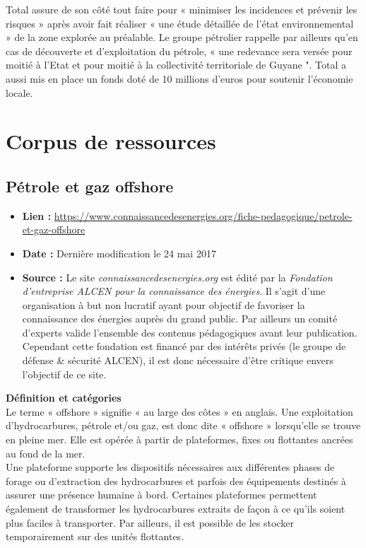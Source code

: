\documentclass[8pt]{article}
\begin{document}
Total assure de son côté tout faire pour « minimiser les incidences et prévenir les risques » après avoir fait réaliser « une étude détaillée de l'état environnemental » de la zone explorée au préalable. Le groupe pétrolier rappelle par ailleurs qu'en cas de découverte et d'exploitation du pétrole, « une redevance sera versée pour moitié à l'Etat et pour moitié à la collectivité territoriale de Guyane ". Total a aussi mis en place un fonds doté de 10 millions d'euros pour soutenir l'économie locale.\\

\newpage
\section{Corpus de ressources}

\subsection{Pétrole et gaz offshore}
\label{sec:definition}

\begin{itemize}
	\item \textbf{Lien : }  \url{https://www.connaissancedesenergies.org/fiche-pedagogique/petrole-et-gaz-offshore} 
	\item \textbf{Date : }  Dernière modification le 24 mai 2017
	\item \textbf{Source : } Le site \textit{connaissancedesenergies.org} est édité par la \textit{Fondation d'entreprise ALCEN pour la connaissance des énergies}. Il s'agit d'une organisation à but non 
	lucratif ayant pour objectif de favoriser la connaissance des énergies auprès du grand public. Par ailleurs un comité d'experts valide l'ensemble des contenus pédagogiques avant leur publication. Cependant cette fondation est financé par des intérêts privés (le groupe de défense \& sécurité ALCEN), il est donc nécessaire d'être critique envers l'objectif de ce site.
\end{itemize}

\textbf{Définition et catégories}\\

Le terme « offshore » signifie « au large des côtes » en anglais. Une exploitation d’hydrocarbures, pétrole et/ou gaz, est donc dite « offshore » lorsqu'elle se trouve en pleine mer. Elle est opérée à partir de plateformes, fixes ou flottantes ancrées au fond de la mer.\\

Une plateforme supporte les dispositifs nécessaires aux différentes phases de forage ou d'extraction des hydrocarbures et parfois des équipements destinés à assurer une présence humaine à bord. Certaines plateformes permettent également de transformer les hydrocarbures extraits de façon à ce qu'ils soient plus faciles à transporter. Par ailleurs, il est possible de les stocker temporairement sur des unités flottantes.\\
\end{document}
